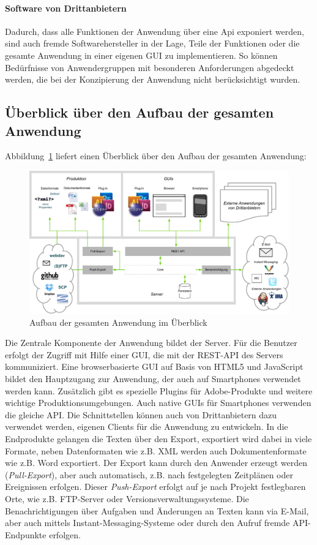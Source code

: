 \paragraph{Software von Drittanbietern} Dadurch, dass alle Funktionen der Anwendung über eine Api exponiert werden, sind auch fremde Softwarehersteller in der Lage, Teile der Funktionen oder die gesamte Anwendung in einer eigenen GUI zu implementieren. So können Bedürfnisse von Anwendergruppen mit besonderen Anforderungen abgedeckt werden, die bei der Konzipierung der Anwendung nicht berücksichtigt wurden.

\subsection{Überblick über den Aufbau der gesamten Anwendung}

Abbildung~\ref{chart:gesamtessystem} liefert einen Überblick über den Aufbau der gesamten Anwendung:

\begin{figure}[htb]
\begin{center}
\includegraphics[width=\textwidth]{media/GesamtesSystem.pdf}
\caption{Aufbau der gesamten Anwendung im Überblick}
\label{chart:gesamtessystem}
\end{center}
\end{figure}

Die Zentrale Komponente der Anwendung bildet der Server. Für die Benutzer erfolgt der Zugriff mit Hilfe einer GUI, die mit der REST-API des Servers kommuniziert. Eine browserbasierte GUI auf Basis von HTML5 und JavaScript bildet den Hauptzugang zur Anwendung, der auch auf Smartphones verwendet werden kann. Zusätzlich gibt es spezielle Plugins für Adobe-Produkte und weitere wichtige Produktionsumgebungen. Auch native GUIs für Smartphones verwenden die gleiche API. Die Schnittstellen können auch von Drittanbietern dazu verwendet werden, eigenen Clients für die Anwendung zu entwickeln. In die Endprodukte gelangen die Texten über den Export, exportiert wird dabei in viele Formate, neben Datenformaten wie z.B. XML werden auch Dokumentenformate wie z.B. Word exportiert. Der Export kann durch den Anwender erzeugt werden (\emph{Pull-Export}), aber auch automatisch, z.B. nach festgelegten Zeitplänen oder Ereignissen erfolgen. Dieser \emph{Push-Export} erfolgt auf je nach Projekt festlegbaren Orte, wie z.B. FTP-Server oder Versionsverwaltungssysteme. Die Benachrichtigungen über Aufgaben und Änderungen an Texten kann via E-Mail, aber auch mittels Instant-Messaging-Systeme oder durch den Aufruf fremde API-Endpunkte erfolgen.

